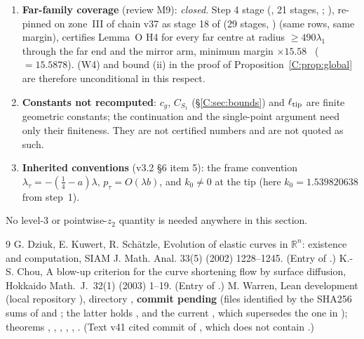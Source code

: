 \documentclass[11pt]{article}
\begin{document}
\begin{enumerate}[leftmargin=*]
\item \textbf{Far-family coverage} (review M9): \emph{closed}. Step 4 stage  (, 21 stages, ; ), re-pinned on zone~III of chain v37 as stage 18 of  (29 stages, ) (same rows, same margin), certifies Lemma~O H4 for every far centre at radius $\ge490\lambda_1$ through the far end and the mirror arm, minimum margin $\times15.58$ \tC\ ($=15.5878$). (W4) and bound (ii) in the proof of Proposition~\ref{C:prop:global} are therefore unconditional in this respect.
\item \textbf{Constants not recomputed}: $c_g$, $C_{S_1}$ (\S\ref{C:sec:bounds}) and $\ell_{\rm tip}$ are finite geometric constants; the continuation and the single-point argument need only their finiteness. They are not certified numbers and are not quoted as such.
\item \textbf{Inherited conventions} (v3.2 \S6 item 5): the frame convention $\lambda_\tau=-(\frac14-a)\lambda$, $p_\tau=O(\lambda b)$, and $k_0\ne0$ at the tip (here $k_0=1.539820638$ from step~1).
\end{enumerate}
No level-3 or pointwise-$z_2$ quantity is needed anywhere in this section.

\ifdefined\stepmain\else
\begin{thebibliography}{9}
 G. Dziuk, E. Kuwert, R. Sch\"atzle, Evolution of elastic curves in $\mathbb R^n$: existence and computation, SIAM J. Math. Anal. 33(5) (2002) 1228--1245. (Entry  of .)
 K.-S. Chou, A blow-up criterion for the curve shortening flow by surface diffusion, Hokkaido Math.\ J.\ 32(1) (2003) 1--19. (Entry  of .)
 M. Warren, Lean development  (local repository ), directory , \textbf{commit pending} (files identified by the SHA256 sums of  and ; the latter holds ,  and the current , which supersedes the one in ); theorems , , , , , . (Text v41 cited commit  of , which does not contain .)
\end{thebibliography}
\end{document}
